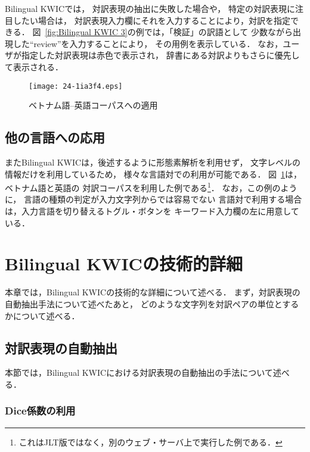 \documentclass[japanese]{jnlp_1.4}
\begin{document}
Bilingual KWICでは，
対訳表現の抽出に失敗した場合や，
\pagebreak
特定の対訳表現に注目したい場合は，
対訳表現入力欄にそれを入力することにより，対訳を指定できる．
図~\ref{fig:Bilingual KWIC 3}の例では，「検証」の訳語として
少数ながら出現した``review''を入力することにより，
その用例を表示している．
なお，ユーザが指定した対訳表現は赤色で表示され，
辞書にある対訳よりもさらに優先して表示される．

\begin{figure}[b]
\vspace{-1\Cvs}
\begin{center}
\texttt{[image: 24-1ia3f4.eps]}
\end{center}
\caption{ベトナム語--英語コーパスへの適用}
\label{fig:Bilingual KWIC v}
\end{figure}


\subsection{他の言語への応用}

またBilingual KWICは，後述するように形態素解析を利用せず，
文字レベルの情報だけを利用しているため，
様々な言語対での利用が可能である．
図~\ref{fig:Bilingual KWIC v}は，ベトナム語と英語の
対訳コーパスを利用した例である\hspace{-0pt}\footnote{これはJLT版ではなく，別のウェブ・サーバ上で実行した例である．}．
なお，この例のように，
言語の種類の判定が入力文字列からでは容易でない
言語対で利用する場合は，入力言語を切り替えるトグル・ボタンを
キーワード入力欄の左に用意している．


\section{Bilingual KWICの技術的詳細}
\label{sec:spec}

本章では，Bilingual KWICの技術的な詳細について述べる．
まず，対訳表現の自動抽出手法について述べたあと，
どのような文字列を対訳ペアの単位とするかについて述べる．


\subsection{対訳表現の自動抽出}

本節では，Bilingual KWICにおける対訳表現の自動抽出の手法について述べる．


\subsubsection{Dice係数の利用}
\end{document}
